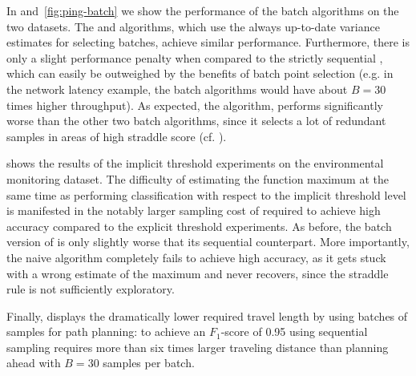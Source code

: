 In  and~\ref{fig:ping-batch} we show the performance
of the batch algorithms on the two datasets. The \bacl and \bstr algorithms,
which use the always up-to-date variance estimates for selecting batches,
achieve similar performance. Furthermore, there is only a slight performance
penalty when compared to the strictly sequential \str, which can easily be
outweighed by the benefits of batch point selection (e.g. in the network
latency example, the batch algorithms would have about $B = 30$ times higher
throughput). As expected, the \rstr algorithm, performs significantly
worse than the other two batch algorithms, since it selects a lot of
redundant samples in areas of high straddle score
(cf. ).

 shows the results of the implicit threshold experiments
on the environmental monitoring dataset. The difficulty of estimating the
function maximum at the same time as performing classification with respect to
the implicit threshold level is manifested in the notably larger sampling cost
of \iacl required to achieve high accuracy compared to the explicit threshold
experiments. As before, the batch version of
\iacl is only slightly worse that its sequential counterpart.
More importantly, the naive \istr algorithm completely
fails to achieve high accuracy, as it gets stuck with a wrong estimate of
the maximum and never recovers, since the straddle rule is not
sufficiently exploratory.

Finally,  displays the dramatically lower required travel
length by using batches of samples for path planning: to achieve
an $F_1$-score of 0.95 using sequential sampling requires more than six times
larger traveling distance than planning ahead with $B = 30$
samples per batch.

